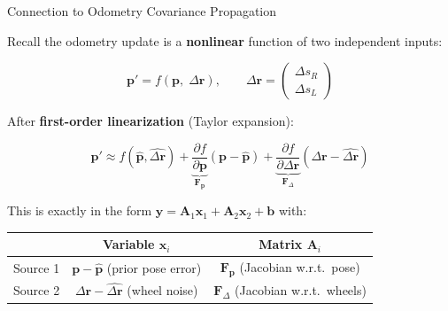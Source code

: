 \documentclass[aspectratio=169, 11pt]{beamer}
\begin{document}
\begin{frame}{Connection to Odometry Covariance Propagation}

Recall the odometry update is a \textbf{nonlinear} function of two independent inputs:

$$\mathbf{p}' = f\!\left(\mathbf{p},\; \Delta \mathbf{r}\right),
\qquad \Delta\mathbf{r} = \begin{pmatrix}\Delta s_R \\ \Delta s_L\end{pmatrix}$$

\vspace{4pt}

After \textbf{first-order linearization} (Taylor expansion):

$$\mathbf{p}' \approx f(\hat{\mathbf{p}}, \hat{\Delta\mathbf{r}})
  + \underbrace{\frac{\partial f}{\partial \mathbf{p}}}_{\mathbf{F}_\mathbf{p}} (\mathbf{p} - \hat{\mathbf{p}})
  + \underbrace{\frac{\partial f}{\partial \Delta\mathbf{r}}}_{\mathbf{F}_\Delta} (\Delta\mathbf{r} - \hat{\Delta\mathbf{r}})$$

\vspace{6pt}

This is exactly in the form $\mathbf{y} = \mathbf{A}_1 \mathbf{x}_1 + \mathbf{A}_2 \mathbf{x}_2 + \mathbf{b}$ with:

\begin{center}
\renewcommand{\arraystretch}{1.4}
\begin{tabular}{c|c|c}
  & Variable $\mathbf{x}_i$ & Matrix $\mathbf{A}_i$ \\
  \hline
  Source 1 & $\mathbf{p} - \hat{\mathbf{p}}$ (prior pose error) & $\mathbf{F}_\mathbf{p}$ (Jacobian w.r.t.\ pose) \\
  Source 2 & $\Delta\mathbf{r} - \hat{\Delta\mathbf{r}}$ (wheel noise) & $\mathbf{F}_\Delta$ (Jacobian w.r.t.\ wheels) \\
\end{tabular}
\end{center}

\end{frame}
\end{document}
